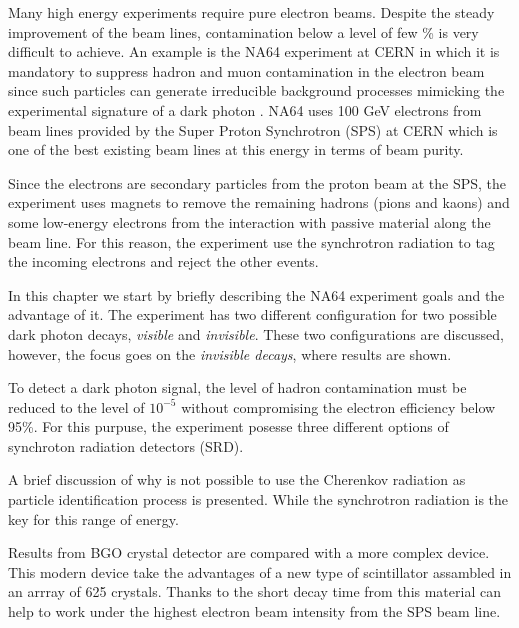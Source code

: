 
Many high energy experiments require pure electron beams. Despite the steady improvement of the beam lines,
contamination below a level of few \% is very difficult to achieve. An example is the NA64 experiment\cite{na64} at CERN
in which it is mandatory to suppress hadron and muon contamination in the electron beam since such particles can
generate irreducible background processes mimicking the experimental signature of a dark photon \cite{prlpaper, proposal}.
NA64 uses 100 GeV electrons from beam lines provided by the Super Proton Synchrotron (SPS) at CERN which is one of the
best existing beam lines at this energy in terms of beam purity\cite{sps}.\par

Since the electrons are secondary particles from the proton beam at the SPS, the experiment uses magnets to remove the
remaining hadrons (pions and kaons) and some low-energy electrons from the interaction with passive material along the
beam line. For this reason, the experiment use the synchrotron radiation to tag the incoming electrons and reject the
other events.\par

In this chapter we start by briefly describing the NA64 experiment goals and the advantage of it. The experiment has two
different configuration for two possible dark photon decays, {\it visible} and {\it invisible}. These two configurations are
discussed, however, the focus goes on the {\it invisible decays}, where results are shown.\par

To detect a dark photon signal, the level of hadron contamination must be reduced to the level of $10^{-5}$ without
compromising the electron efficiency below 95\%. For this purpuse, the experiment posesse three different options of
synchroton radiation detectors (SRD).\par

A brief discussion of why is not possible to use the Cherenkov radiation as particle identification process is
presented. While the synchrotron radiation is the key for this range of energy. \par

Results from BGO crystal detector are compared with a more complex device. This modern device take
the advantages of a new type of scintillator assambled in an arrray of 625 crystals. Thanks to the short decay time from this
material can help to work under the highest electron beam intensity from the SPS beam line. \par

